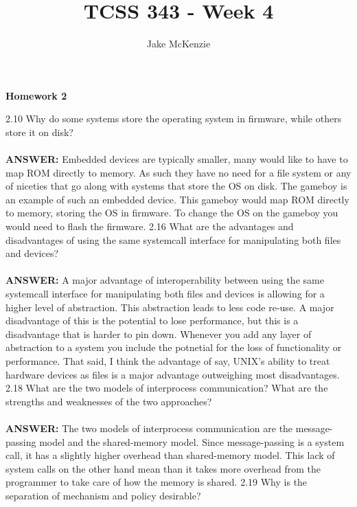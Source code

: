 \documentclass[12pt]{article}
\begin{document}
\title{TCSS 343 - Week 4}
\author{Jake McKenzie}
\maketitle
\noindent\centerline{\textbf{Homework 2}}
2.10 Why do some systems store the operating system in firmware, while
others store it on disk?\\\\
\textbf{ANSWER: }Embedded devices are typically smaller, many would
like to have to map ROM directly to memory. As such they have no need 
for a file system or any of niceties that go along with systems that 
store the OS on disk. The gameboy is an example of such an embedded 
device. This gameboy would map ROM directly to memory, storing the 
OS in firmware. To change the OS on the gameboy you would need to flash 
the firmware. 
2.16 What are the advantages and disadvantages of using the same 
systemcall interface for manipulating both files and devices?\\\\
\textbf{ANSWER: }A major advantage of interoperability between 
using the same systemcall interface for manipulating both 
files and devices is allowing for a higher level of abstraction.
This abstraction leads to less code re-use. A major disadvantage 
of this is the potential to lose performance, but this is a 
disadvantage that is harder to pin down. Whenever you add any 
layer of abstraction to a system you include the potnetial for 
the loss of functionality or performance. That said, I think 
the advantage of say, UNIX's ability to treat hardware devices 
as files is a major advantage outweighing most disadvantages.
2.18 What are the two models of interprocess communication? What 
are the strengths and weaknesses of the two approaches?\\\\
\textbf{ANSWER: }The two models of interprocess communication 
are the message-passing model and the shared-memory model. 
Since message-passing is a system call, it has a slightly 
higher overhead than shared-memory model. This lack of system 
calls on the other hand mean than it takes more overhead from
the programmer to take care of how the memory is shared.
2.19 Why is the separation of mechanism and policy desirable?
\end{document}
